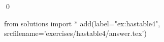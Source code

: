 
\begin{ex} 
  \label{ex:hastable4}
  
  \qed
\end{ex} 
\begin{python0}
from solutions import *
add(label="ex:hastable4",
    srcfilename='exercises/hastable4/answer.tex') 
\end{python0}
